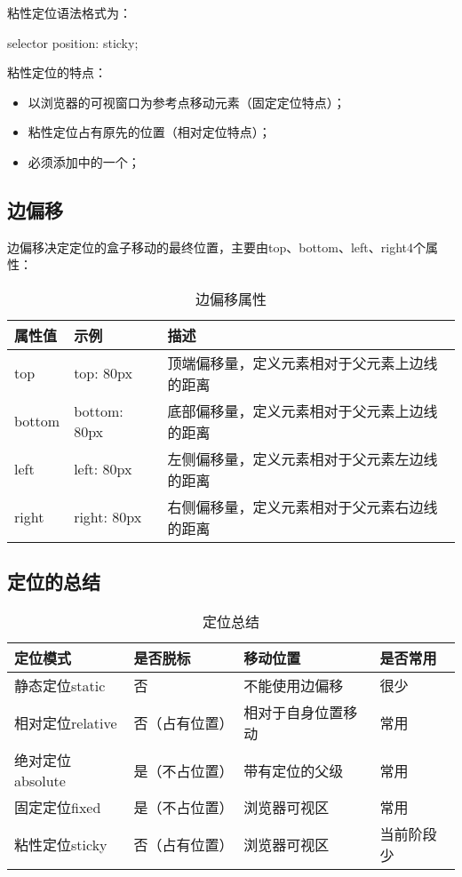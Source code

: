 粘性定位语法格式为：
\begin{css}
	selector {
	position: sticky;
	}
\end{css}
粘性定位的特点：
\begin{itemize}
	\item 以浏览器的可视窗口为参考点移动元素（固定定位特点）；
	\item 粘性定位占有原先的位置（相对定位特点）；
	\item 必须添加中的一个；
\end{itemize}

\subsection{边偏移\label{edgeOffset}}
边偏移决定定位的盒子移动的最终位置，主要由top、bottom、left、right4个属性：
\begin{table}[H]
	\centering
	\caption{边偏移属性}
	\label{edgeOffsetTable}
	\begin{tabular}{lll}
		\hline
		属性值    & 示例           & 描述                     \\
		\hline
		top    & top: 80px    & 顶端偏移量，定义元素相对于父元素上边线的距离 \\
		bottom & bottom: 80px & 底部偏移量，定义元素相对于父元素上边线的距离 \\
		left   & left: 80px   & 左侧偏移量，定义元素相对于父元素左边线的距离 \\
		right  & right: 80px  & 右侧偏移量，定义元素相对于父元素右边线的距离 \\
		\hline
	\end{tabular}
\end{table}
\subsection{定位的总结}
\begin{table}[H]
	\centering
	\caption{定位总结}
	\begin{tabular}{llll}
		\hline
		定位模式         & 是否脱标    & 移动位置      & 是否常用  \\
		\hline
		静态定位static   & 否       & 不能使用边偏移   & 很少    \\
		相对定位relative & 否（占有位置） & 相对于自身位置移动 & 常用    \\
		绝对定位absolute & 是（不占位置） & 带有定位的父级   & 常用    \\
		固定定位fixed    & 是（不占位置） & 浏览器可视区    & 常用    \\
		粘性定位sticky   & 否（占有位置） & 浏览器可视区    & 当前阶段少 \\
		\hline
	\end{tabular}
\end{table}
